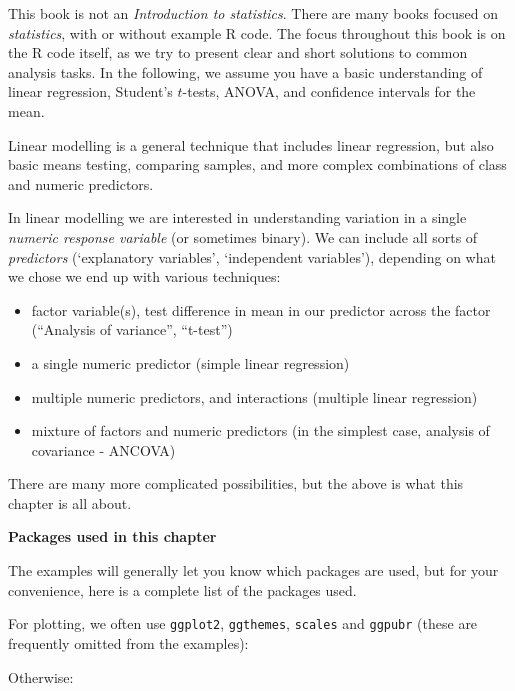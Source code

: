 \documentclass[]{book}
\providecommand{\tightlist}{%
  \setlength{\itemsep}{0pt}\setlength{\parskip}{0pt}}
\begin{document}
This book is not an \emph{Introduction to statistics}. There are many books focused on \emph{statistics}, with or without example R code. The focus throughout this book is on the R code itself, as we try to present clear and short solutions to common analysis tasks. In the following, we assume you have a basic understanding of linear regression, Student's \(t\)-tests, ANOVA, and confidence intervals for the mean.

Linear modelling is a general technique that includes linear regression, but also basic means testing, comparing samples, and more complex combinations of class and numeric predictors.

In linear modelling we are interested in understanding variation in a single \emph{numeric response variable} (or sometimes binary). We can include all sorts of \emph{predictors} (`explanatory variables', `independent variables'), depending on what we chose we end up with various techniques:

\begin{itemize}
\tightlist
\item
  factor variable(s), test difference in mean in our predictor across the factor (``Analysis of variance'', ``t-test'')
\item
  a single numeric predictor (simple linear regression)
\item
  multiple numeric predictors, and interactions (multiple linear regression)
\item
  mixture of factors and numeric predictors (in the simplest case, analysis of covariance - ANCOVA)
\end{itemize}

There are many more complicated possibilities, but the above is what this chapter is all about.

\textbf{Packages used in this chapter}

The examples will generally let you know which packages are used, but for your convenience, here is a complete list of the packages used.

For plotting, we often use \texttt{ggplot2}, \texttt{ggthemes}, \texttt{scales} and \texttt{ggpubr} (these are frequently omitted from the examples):

Otherwise:
\end{document}
